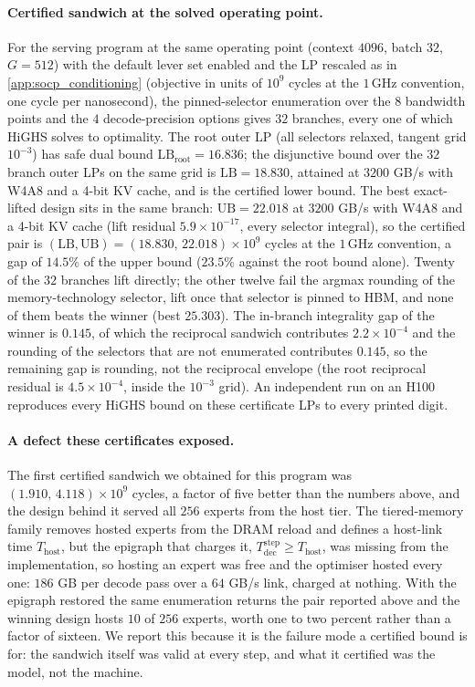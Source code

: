 \paragraph{Certified sandwich at the solved operating point.}
For the serving program at the same operating point (context $4096$, batch
$32$, $G=512$) with the default lever set enabled and the LP rescaled as in
\cref{app:socp_conditioning} (objective in units of $10^{9}$ cycles at the
$1$\,GHz convention, one cycle per nanosecond), the pinned-selector enumeration over the $8$ bandwidth points and the
$4$ decode-precision options gives $32$ branches, every one of which HiGHS
solves to optimality. The root outer LP (all selectors relaxed, tangent grid
$10^{-3}$) has safe dual bound $\mathrm{LB}_{\mathrm{root}}=16.836$; the
disjunctive bound over the $32$ branch outer LPs on the same grid is
$\mathrm{LB}=18.830$, attained at $3200$ GB/s with W4A8 and a 4-bit KV cache,
and is the certified lower bound. The best exact-lifted design sits in the same
branch: $\mathrm{UB}=22.018$ at $3200$ GB/s with W4A8 and a 4-bit KV cache
(lift residual $5.9\times10^{-17}$, every selector integral), so the certified
pair is $(\mathrm{LB},\mathrm{UB})=(18.830,\,22.018)\times10^{9}$ cycles at
the $1$\,GHz convention, a gap of
$14.5\%$ of the upper bound ($23.5\%$ against the root bound alone). Twenty of
the $32$ branches lift directly; the other twelve fail the argmax rounding of
the memory-technology selector, lift once that selector is pinned to HBM, and
none of them beats the winner (best $25.303$). The in-branch integrality gap of
the winner is $0.145$, of which the reciprocal sandwich contributes
$2.2\times10^{-4}$ and the rounding of the selectors that are not enumerated
contributes $0.145$, so the remaining gap is rounding, not the reciprocal
envelope (the root reciprocal residual is $4.5\times10^{-4}$, inside the
$10^{-3}$ grid). An independent run on an H100 reproduces every HiGHS bound on
these certificate LPs to every printed digit.

\paragraph{A defect these certificates exposed.}
The first certified sandwich we obtained for this program was
$(1.910,\,4.118)\times10^{9}$ cycles, a factor of five better than the numbers
above, and the design behind it served all $256$ experts from the host tier. The
tiered-memory family removes hosted experts from the DRAM reload and defines a
host-link time $T_{\mathrm{host}}$, but the epigraph that charges it,
$T^{\mathrm{step}}_{\mathrm{dec}} \ge T_{\mathrm{host}}$, was missing from the
implementation, so hosting an expert was free and the optimiser hosted every
one: $186$ GB per decode pass over a $64$ GB/s link, charged at nothing. With
the epigraph restored the same enumeration returns the pair reported above and
the winning design hosts $10$ of $256$ experts, worth one to two percent rather
than a factor of sixteen. We report this because it is the failure mode a
certified bound is for: the sandwich itself was valid at every step, and what it
certified was the model, not the machine.

